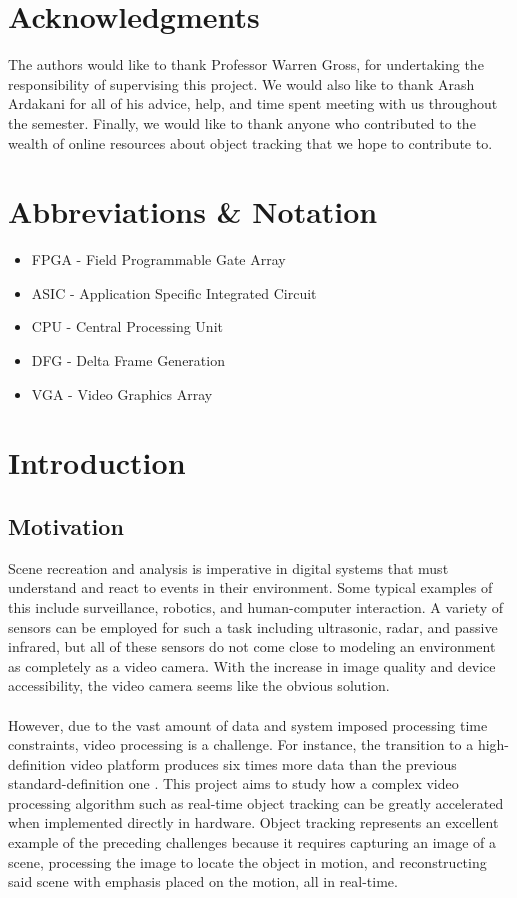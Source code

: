 \documentclass[12pt]{article} %
\begin{document}
\section*{Acknowledgments}
The authors would like to thank Professor Warren Gross, for undertaking the responsibility of supervising this project. We would also like to thank Arash Ardakani for all of his advice, help, and time spent meeting with us throughout the semester. Finally, we would like to thank anyone who contributed to the wealth of online resources about object tracking that we hope to contribute to.
\pagebreak
\tableofcontents
\pagebreak
\section{Abbreviations \& Notation}
\begin{itemize}
\item[] FPGA - Field Programmable Gate Array
\item[] ASIC - Application Specific Integrated Circuit
\item[] CPU - Central Processing Unit
\item[] DFG - Delta Frame Generation
\item[] VGA - Video Graphics Array
\end{itemize}
\section{Introduction}
\subsection{Motivation}
Scene recreation and analysis is imperative in digital systems that must understand and react to events in their environment. Some typical examples of this include surveillance, robotics, and human-computer interaction. A variety of sensors can be employed for such a task including ultrasonic, radar, and passive infrared, but all of these sensors do not come close to modeling an environment as completely as a video camera. With the increase in image quality and device accessibility, the video camera seems like the obvious solution. \\\\
However, due to the vast amount of data and system imposed processing time constraints, video processing is a challenge. For instance, the transition to a high-definition video platform produces six times more data than the previous standard-definition one \cite{3}. This project aims to study how a complex video processing algorithm such as real-time object tracking can be greatly accelerated when implemented directly in hardware. Object tracking represents an excellent example of the preceding challenges because it requires capturing an image of a scene, processing the image to locate the object in motion, and reconstructing said scene with emphasis placed on the motion, all in real-time.
\end{document}
